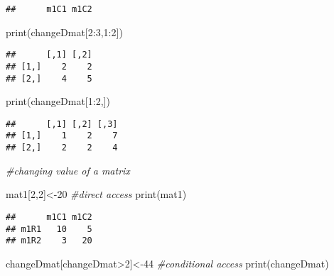 \documentclass[
]{article}
\newenvironment{Shaded}{\begin{snugshade}}{\end{snugshade}}
\newcommand{\CommentTok}[1]{\textcolor[rgb]{0.56,0.35,0.01}{\textit{#1}}}
\newcommand{\DecValTok}[1]{\textcolor[rgb]{0.00,0.00,0.81}{#1}}
\newcommand{\FunctionTok}[1]{\textcolor[rgb]{0.00,0.00,0.00}{#1}}
\newcommand{\NormalTok}[1]{#1}
\newcommand{\OtherTok}[1]{\textcolor[rgb]{0.56,0.35,0.01}{#1}}
\newcommand{\SpecialCharTok}[1]{\textcolor[rgb]{0.00,0.00,0.00}{#1}}
\begin{document}
\begin{verbatim}
##      m1C1 m1C2
\end{verbatim}

\begin{Shaded}
\begin{Highlighting}[]
\FunctionTok{print}\NormalTok{(changeDmat[}\DecValTok{2}\SpecialCharTok{:}\DecValTok{3}\NormalTok{,}\DecValTok{1}\SpecialCharTok{:}\DecValTok{2}\NormalTok{])}
\end{Highlighting}
\end{Shaded}

\begin{verbatim}
##      [,1] [,2]
## [1,]    2    2
## [2,]    4    5
\end{verbatim}

\begin{Shaded}
\begin{Highlighting}[]
\FunctionTok{print}\NormalTok{(changeDmat[}\DecValTok{1}\SpecialCharTok{:}\DecValTok{2}\NormalTok{,])}
\end{Highlighting}
\end{Shaded}

\begin{verbatim}
##      [,1] [,2] [,3]
## [1,]    1    2    7
## [2,]    2    2    4
\end{verbatim}

\begin{Shaded}
\begin{Highlighting}[]
\CommentTok{\#changing value of a matrix}

\NormalTok{mat1[}\DecValTok{2}\NormalTok{,}\DecValTok{2}\NormalTok{]}\OtherTok{\textless{}{-}}\DecValTok{20} \CommentTok{\#direct access}
\FunctionTok{print}\NormalTok{(mat1)}
\end{Highlighting}
\end{Shaded}

\begin{verbatim}
##      m1C1 m1C2
## m1R1   10    5
## m1R2    3   20
\end{verbatim}

\begin{Shaded}
\begin{Highlighting}[]
\NormalTok{changeDmat[changeDmat}\SpecialCharTok{\textgreater{}}\DecValTok{2}\NormalTok{]}\OtherTok{\textless{}{-}}\DecValTok{44} \CommentTok{\#conditional access}
\FunctionTok{print}\NormalTok{(changeDmat)}
\end{Highlighting}
\end{Shaded}
\end{document}
